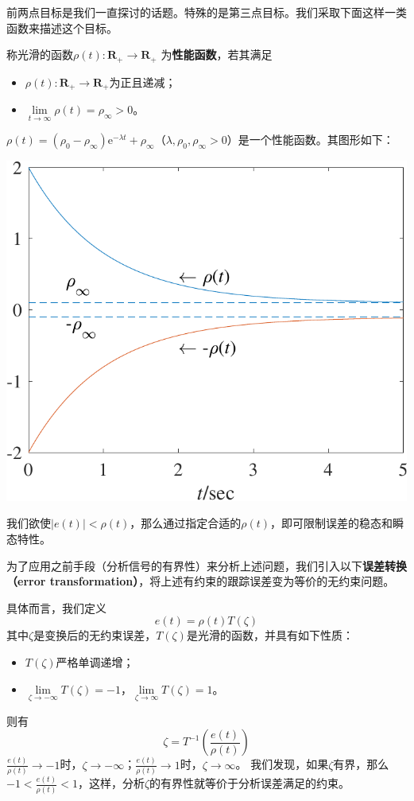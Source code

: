 前两点目标是我们一直探讨的话题。特殊的是第三点目标。我们采取下面这样一类函数来描述这个目标。
\begin{definition}\label{performance_func}
   称光滑的函数$\rho(t):\mathbf{R}_+\to\mathbf{R}_+$
   为{\bf 性能函数}，若其满足
   \begin{itemize}[leftmargin=1em]
    \item $\rho(t):\mathbf{R}_+\to\mathbf{R}_+$为正且递减；
    \item $\lim\limits_{t\to\infty}\rho(t)=\rho_\infty>0$。
\end{itemize}
\end{definition}
\begin{example}[性能函数]
   $\rho(t)=(\rho_0-\rho_{\infty})\mathrm{e}^{-\lambda t}+\rho_\infty$（$\lambda,\rho_0,\rho_{\infty}>0$）是一个性能函数。其图形如下：
   \begin{center}
       \includegraphics[scale=0.5]{figure/adaptive/p.pdf}
       \captionsetup{hypcap=false}
   \end{center}
\end{example}
我们欲使$|e(t)|<\rho(t)$，那么通过指定合适的$\rho(t)$，即可限制误差的稳态和瞬态特性。

为了应用之前手段（分析信号的有界性）来分析上述问题，我们引入以下{\bf 误差转换（error transformation）}，将上述有约束的跟踪误差变为等价的无约束问题。

具体而言，我们定义\[e(t)=\rho(t)T(\zeta)\]
其中$\zeta$是变换后的无约束误差，$T(\zeta)$是光滑的函数，并具有如下性质：
\begin{itemize}[leftmargin=1em]
    \item $T(\zeta)$严格单调递增；
    \item $\lim\limits_{\zeta\to-\infty}T(\zeta)=-1$，$\lim\limits_{\zeta\to\infty}T(\zeta)=1$。
\end{itemize}
则有
\[\zeta = T^{-1}\left(\frac{e(t)}{\rho(t)}\right)\]
$\frac{e(t)}{\rho(t)}\to -1$时，$\zeta\to-\infty$；$\frac{e(t)}{\rho(t)}\to 1$时，$\zeta\to\infty$。
我们发现，如果$\zeta$有界，那么$-1<\frac{e(t)}{\rho(t)}<1$，这样，分析$\zeta$的有界性就等价于分析误差满足的约束。

